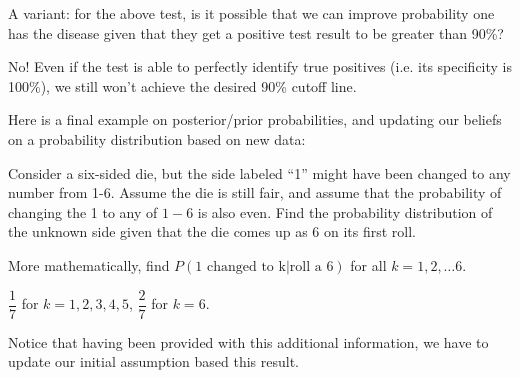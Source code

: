 \documentclass[../main.tex]{subfiles}
\begin{document}
\begin{example}
A variant: for the above test, is it possible that we can improve probability one has the disease given that they get a positive test result to be greater than 90\%? 
\end{example}

\begin{solution}
No! Even if the test is able to perfectly identify true positives (i.e. its specificity is 100\%), we still won't achieve the desired 90\% cutoff line. 
\end{solution}
Here is a final example on posterior/prior probabilities, and updating our beliefs on a probability distribution based on new data: 
\begin{example} %
Consider a six-sided die, but the side labeled ``1'' might have been changed to any number from 1-6. Assume the die is still fair, and assume that the probability of changing the 1 to any of $1-6$ is also even. Find the probability distribution of the unknown side given that the die comes up as 6 on its first roll. 

More mathematically, find $P(\text{1 changed to k}|\text{roll a 6})$ for all $k = 1, 2, \ldots 6$. 
\end{example}

\begin{solution}
$\dfrac{1}{7}$ for $k = 1, 2, 3, 4, 5$, $\dfrac{2}{7}$ for $k = 6$. 
\end{solution}


Notice that having been provided with this additional information, we have to update our initial assumption based this result.  
\end{document}
